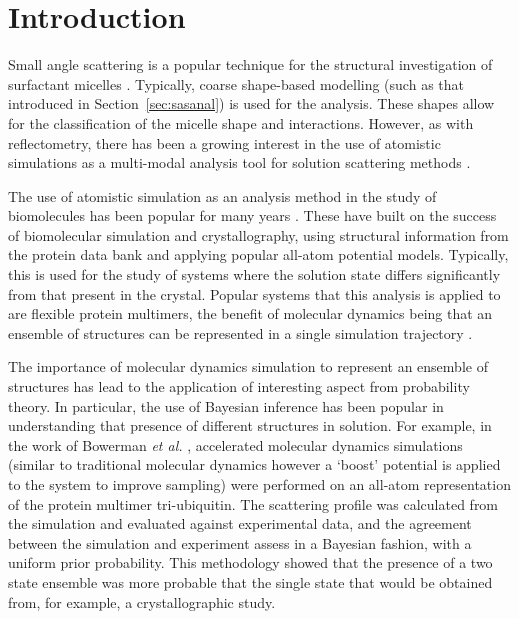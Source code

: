 \section{Introduction}

Small angle scattering is a popular technique for the structural investigation of surfactant micelles \cite{sanchez-fernandez_micellization_2016}.
Typically, coarse shape-based modelling (such as that introduced in Section~\ref{sec:sasanal}) is used for the analysis.
These shapes allow for the classification of the micelle shape and interactions.
However, as with reflectometry, there has been a growing interest in the use of atomistic simulations as a multi-modal analysis tool for solution scattering methods \cite{ivanovic_temperature-dependent_2018}.

The use of atomistic simulation as an analysis method in the study of biomolecules has been popular for many years \cite{perkins_solution_1991,mayans_demonstration_1995,hub_interpreting_2018}.
These have built on the success of biomolecular simulation and crystallography, using structural information from the protein data bank \cite{noauthor_rcsb_nodate} and applying popular all-atom potential models.
Typically, this is used for the study of systems where the solution state differs significantly from that present in the crystal.
Popular systems that this analysis is applied to are flexible protein multimers, the benefit of molecular dynamics being that an ensemble of structures can be represented in a single simulation trajectory \cite{chen_validating_2014,bowerman_determining_2017}.

The importance of molecular dynamics simulation to represent an ensemble of structures has lead to the application of interesting aspect from probability theory.
In particular, the use of Bayesian inference has been popular in understanding that presence of different structures in solution.
For example, in the work of Bowerman \emph{et al.} \cite{bowerman_determining_2017}, accelerated molecular dynamics simulations (similar to traditional molecular dynamics however a `boost' potential is applied to the system to improve sampling) were performed on an all-atom representation of the protein multimer tri-ubiquitin.
The scattering profile was calculated from the simulation and evaluated against experimental data, and the agreement between the simulation and experiment assess in a Bayesian fashion, with a uniform prior probability.
This methodology showed that the presence of a two state ensemble was more probable that the single state that would be obtained from, for example, a crystallographic study.

